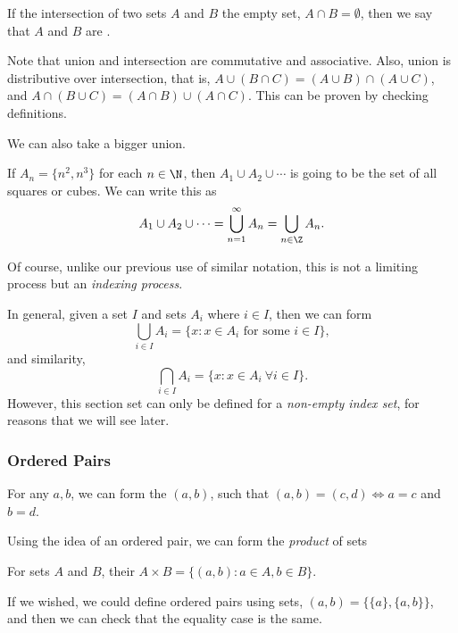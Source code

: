 \begin{definition}[Disjoint]
	If the intersection of two sets $A$ and $B$ the empty set, $A \cap B = \emptyset$, then we say that $A$ and $B$ are .
\end{definition}

Note that union and intersection are commutative and associative. Also, union is distributive over intersection, that is, $A \cup (B \cap C) = (A \cup B) \cap (A \cup C)$, and $A \cap (B \cup C) = (A \cap B) \cup (A \cap C)$. This can be proven by checking definitions.

We can also take a bigger union.
\begin{example}
	If $A_n = \{n^2, n^3 \}$ for each $n \in \N$, then
	$
	A_1 \cup A_2 \cup \cdots
	$
	is going to be the set of all squares or cubes. We can write this as
	$$
	A_1 \cup A_2 \cup \cdots = \bigcup_{n = 1}^{\infty} A_n = \bigcup_{n \in \Z} A_n.
	$$
\end{example}
Of course, unlike our previous use of similar notation, this is not a limiting process but an \emph{indexing process}. 

In general, given a set $I$ and sets $A_i$ where $i \in I$, then we can form
$$
\bigcup_{i \in I} A_i = \{x : x \in A_i \text{ for some } i \in I\},
$$
and similarity,
$$
\bigcap_{i \in I} A_i = \{x : x \in A_i\ \forall i \in I\}.
$$
However, this section set can only be defined for a \emph{non-empty index set}, for reasons that we will see later.


\subsubsection{Ordered Pairs}
\vspace{\baselineskip}
\begin{definition}
	For any $a, b$, we can form the  $(a, b)$, such that $(a, b) = (c, d) \iff a = c$ and $b = d$.
\end{definition}

Using the idea of an ordered pair, we can form the \emph{product} of sets
\begin{definition}
	For sets $A$ and $B$, their  $A \times B = \{(a ,b) : a \in A, b \in B\}$.
\end{definition}

\begin{remark}
	If we wished, we could define ordered pairs using sets, $(a, b) = \{\{a\}, \{a, b\}\}$, and then we can check that the equality case is the same.
\end{remark}

